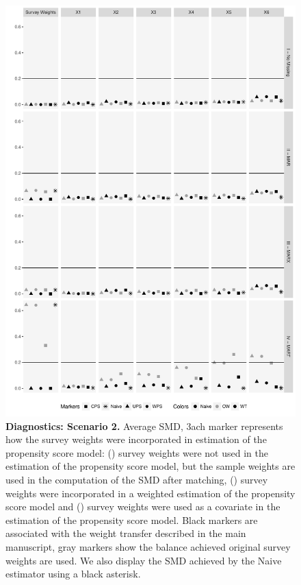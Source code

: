 \documentclass[oupdraft]{bio}
\newcommand{\mysquare}[1]{\tikz{\node[draw=#1,fill=#1,rectangle,minimum
width=0.18cm,minimum height=0.18cm,inner sep=0pt] at (0,0) {};}}
\newcommand{\mycircle}[1]{\tikz{\node[draw=#1,fill=#1,circle,minimum
width=0.2cm,minimum height=0.2cm,inner sep=0pt] at (0,0) {};}}
\newcommand{\mytriangle}[1]{\tikz{\node[draw=#1,fill=#1,isosceles
triangle,isosceles triangle stretches,shape border rotate=90,minimum
width=0.2cm,minimum height=0.2cm,inner sep=0pt] at (0,0) {};}}
\begin{document}
\begin{figure}[t]
\centering
\includegraphics[scale=0.63]{SMD_SC2_v2.pdf}
\caption{{\small{}\textbf{Diagnostics: Scenario 2.} Average SMD, 3ach marker represents how the survey weights were incorporated in estimation of the propensity score model: (\mytriangle{black}) survey weights were not used in the estimation of the propensity score model, but the sample weights are used in the computation of the SMD after matching, (\mycircle{black}) survey weights were incorporated in a weighted estimation of the propensity score model and (\mysquare{black})  survey weights were used as a covariate in the estimation of the propensity score model. Black markers are associated with the weight transfer described in the main manuscript, gray markers show the balance achieved original survey weights are used. We also display the SMD achieved by the Naive estimator using a black asterisk.}}
\label{Diagnostics2} 
\end{figure}
\end{document}
